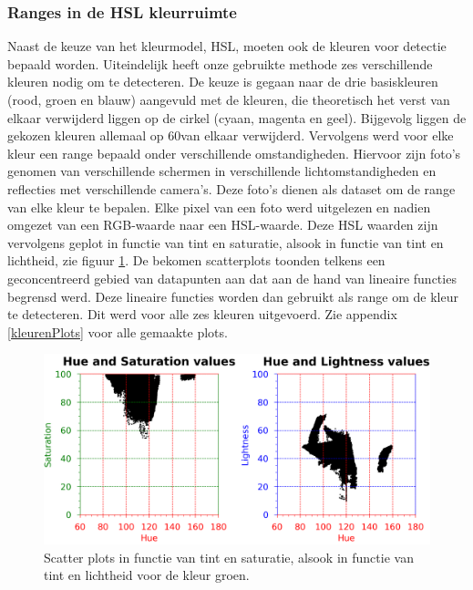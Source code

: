 \subsubsection{Ranges in de HSL kleurruimte} \label{Ranges}
Naast de keuze van het kleurmodel, HSL, moeten ook de kleuren voor detectie bepaald worden. Uiteindelijk heeft onze gebruikte methode zes verschillende kleuren nodig om te detecteren. De keuze is gegaan naar de drie basiskleuren (rood, groen en blauw) aangevuld met de kleuren, die theoretisch het verst van elkaar verwijderd liggen op de cirkel (cyaan, magenta en geel). Bijgevolg liggen de gekozen kleuren allemaal op 60\degree  \space van elkaar verwijderd. Vervolgens werd voor elke kleur een range bepaald onder verschillende omstandigheden. Hiervoor zijn foto's genomen van verschillende schermen in verschillende lichtomstandigheden en reflecties met verschillende camera's. Deze foto's dienen als dataset om de range van elke kleur te bepalen. Elke pixel van een foto werd uitgelezen en nadien omgezet van een RGB-waarde naar een HSL-waarde. Deze HSL waarden zijn vervolgens geplot in functie van tint en saturatie, alsook in functie van tint en lichtheid, zie figuur \ref{hslPlot}. De bekomen scatterplots toonden telkens een geconcentreerd gebied van datapunten aan dat aan de hand van lineaire functies begrensd werd. Deze lineaire functies worden dan gebruikt als range om de kleur te detecteren. Dit werd voor alle zes kleuren uitgevoerd. Zie appendix \ref{kleurenPlots} voor alle gemaakte plots. \cite{TSAI20121291}

\begin{figure}[H]
	\center
	\includegraphics[width=\textwidth]{img/hslGreen.png}
	\caption{Scatter plots in functie van tint en saturatie, alsook in functie van tint en lichtheid voor de kleur groen.}
	\label{hslPlot}
\end{figure}

